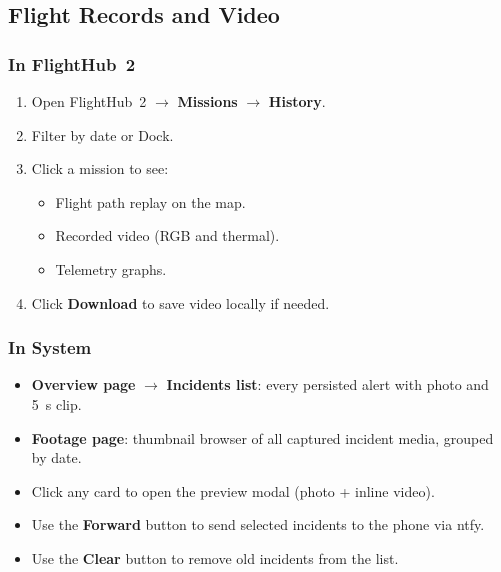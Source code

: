 \documentclass[11pt,letterpaper]{article}
\newcommand{\photoslot}[1]{%
  \begin{center}
  \fbox{\begin{minipage}[c][3.2cm][c]{0.85\textwidth}
    \centering\color{uavgrey}\small\itshape[PHOTO / SCREENSHOT: #1]
  \end{minipage}}
  \end{center}
}
\begin{document}

\subsection{Flight Records and Video}

\subsubsection{In FlightHub~2}

\begin{enumerate}[leftmargin=1.5em]
  \item Open FlightHub~2 $\rightarrow$ \textbf{Missions} $\rightarrow$ \textbf{History}.
  \item Filter by date or Dock.
  \item Click a mission to see:
    \begin{itemize}[leftmargin=1.2em]
      \item Flight path replay on the map.
      \item Recorded video (RGB and thermal).
      \item Telemetry graphs.
    \end{itemize}
  \item Click \textbf{Download} to save video locally if needed.
\end{enumerate}

\subsubsection{In System}

\begin{itemize}[leftmargin=1.5em]
  \item \textbf{Overview page} $\rightarrow$ \textbf{Incidents list}: every persisted alert with photo and 5~s clip.
  \item \textbf{Footage page}: thumbnail browser of all captured incident media, grouped by date.
  \item Click any card to open the preview modal (photo + inline video).
  \item Use the \textbf{Forward} button to send selected incidents to the phone via ntfy.
  \item Use the \textbf{Clear} button to remove old incidents from the list.
\end{itemize}
\end{document}
